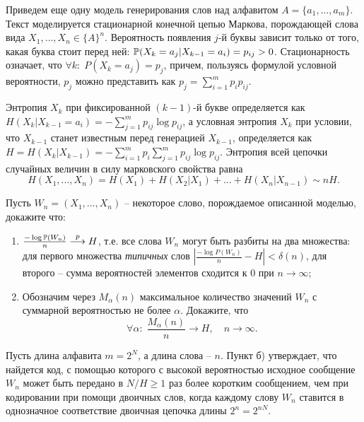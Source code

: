 \begin{problem}
Приведем еще одну модель генерирования слов над алфавитом $A = \{a_1,...,a_m\}$. Текст моделируется стационарной конечной цепью Маркова, порождающей слова вида  $X_1,\ldots,X_n \in \{A\}^{n}$.   
Вероятность появления $j$-й буквы зависит только от того, какая буква стоит перед ней: $\mathrm{{\mathbb P}}(X_k = a_j| X_{k-1} = a_i) = p_{ij} > 0$. Стационарность означает, что $\forall k: \; P(X_k = a_j) = p_j$, причем, пользуясь формулой условной вероятности, $p_j$ можно представить как $p_j = \sum_{i=1}^m p_i p_{ij}$. 

Энтропия $X_k$ при фиксированной $(k-1)$-й букве определяется как $H(X_k|X_{k-1} = a_i) = -\sum_{j = 1}^m p_{ij}\log{p_{ij}}$, а условная энтропия $X_k$ при условии, что $X_{k-1}$ станет известным перед генерацией $X_{k-1}$, определяется  как $H = H(X_k|X_{k-1}) = -\sum_{i=1}^m p_i \sum_{j=1}^m p_{ij}\log{p_{ij}}$. Энтропия всей цепочки случайных величин в силу марковского свойства равна
\[
H(X_1,..., X_n) = H(X_1) + H(X_2|X_{1}) + \ldots + H(X_n|X_{n-1}) \sim n H.
\]

Пусть $W_n = (X_1,..., X_n)$ -- некоторое слово, порождаемое описанной моделью, докажите что:
\begin{enumerate}

\item $\frac{-\log \mathrm{{\mathbb P}}(W_n)}{n} \overset{p}{\longrightarrow} H$, т.е. все слова $W_n$  могут быть разбиты на два множества: для первого множества \textit{типичных} слов $|\frac{-\log P(W_n)}{n} - H| < \delta(n)$, для второго -- сумма вероятностей элементов сходится к 0 при $n\rightarrow \infty$;

\item Обозначим через $M_\alpha(n)$ максимальное количество значений $W_n$ с суммарной вероятностью не более $\alpha$. Докажите, что
\[
\forall \alpha: \;  \frac{M_\alpha(n)}{n} \to H, \quad n \to \infty.
\]

\end{enumerate}
\end{problem}

\begin{remark}
Пусть длина алфавита $m = 2^N$, а длина слова -- $n$. Пункт б) утверждает, что найдется код, с помощью которого с высокой вероятностью исходное сообщение $W_n$ может быть передано в $N/H \geq 1$ раз более коротким сообщением, чем при кодировании при помощи двоичных слов, когда каждому слову $W_n$ ставится в однозначное соответствие двоичная цепочка длины $2^n = 2^{nN}$.
\end{remark}


